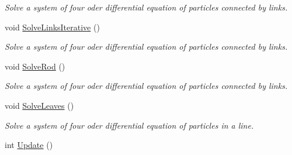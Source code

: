 \begin{DoxyCompactItemize}
\begin{DoxyCompactList}\small\item\em \-Solve a system of four oder differential equation of particles connected by links. \end{DoxyCompactList}\item 
void \hyperlink{classForces_abcac13d7754b73f6f22b2900a0d46d7d}{\-Solve\-Links\-Iterative} ()
\begin{DoxyCompactList}\small\item\em \-Solve a system of four oder differential equation of particles connected by links. \end{DoxyCompactList}\item 
void \hyperlink{classForces_a3953ee74479102530a979e3cd447d174}{\-Solve\-Rod} ()
\begin{DoxyCompactList}\small\item\em \-Solve a system of four oder differential equation of particles connected by links. \end{DoxyCompactList}\item 
void \hyperlink{classForces_a7a03a3d52f5a114cbbc22e60af60c049}{\-Solve\-Leaves} ()
\begin{DoxyCompactList}\small\item\em \-Solve a system of four oder differential equation of particles in a line. \end{DoxyCompactList}\item 
\hypertarget{classForces_a02e68a26ce7e19af9d0b729af61e72d3}{int \hyperlink{classForces_a02e68a26ce7e19af9d0b729af61e72d3}{\-Update} ()}\label{classForces_a02e68a26ce7e19af9d0b729af61e72d3}


\end{DoxyCompactItemize}
